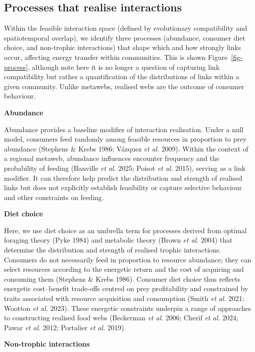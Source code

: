 \documentclass[
]{article}
\begin{document}
\subsection{Processes that realise
interactions}\label{sec-process-realisation}

Within the feasible interaction space (defined by evolutionary
compatibility and spatiotemporal overlap), we identify three processes
(abundance, consumer diet choice, and non-trophic interactions) that
shape which and how strongly links occur, affecting energy transfer
within communities. This is shown Figure~\ref{fig-process}, although
note here it is no longer a question of capturing link compatibility but
rather a quantification of the distributions of links within a given
community. Unlike metawebs, realised webs are the outcome of consumer
behaviour.

\textbf{Abundance}

Abundance provides a baseline modifier of interaction realisation. Under
a null model, consumers feed randomly among feasible resources in
proportion to prey abundance (Stephens \& Krebs 1986; Vázquez \emph{et
al.} 2009). Within the context of a regional metaweb, abundance
influences encounter frequency and the probability of feeding (Banville
\emph{et al.} 2025; Poisot \emph{et al.} 2015), serving as a link
modifier. It can therefore help predict the distribution and strength of
realised links but does not explicitly establish feasibility or capture
selective behaviour and other constraints on feeding.

\textbf{Diet choice}

Here, we use diet choice as an umbrella term for processes derived from
optimal foraging theory (Pyke 1984) and metabolic theory (Brown \emph{et
al.} 2004) that determine the distribution and strength of realised
trophic interactions. Consumers do not necessarily feed in proportion to
resource abundance; they can select resources according to the energetic
return and the cost of acquiring and consuming them (Stephens \& Krebs
1986). Consumer diet choice thus reflects energetic cost--benefit
trade-offs centred on prey profitability and constrained by traits
associated with resource acquisition and consumption (Smith \emph{et
al.} 2021; Wootton \emph{et al.} 2023). These energetic constraints
underpin a range of approaches to constructing realised food webs
(Beckerman \emph{et al.} 2006; Cherif \emph{et al.} 2024; Pawar \emph{et
al.} 2012; Portalier \emph{et al.} 2019).

\textbf{Non-trophic interactions}
\end{document}
